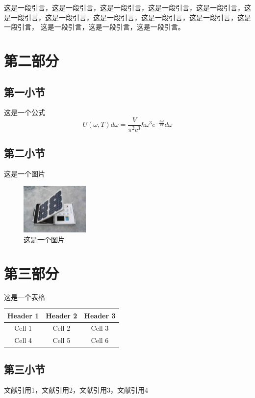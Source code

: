\documentclass[twocolumn]{ctexart}
\begin{document}
	这是一段引言，这是一段引言，这是一段引言，这是一段引言，这是一段引言，这是一段引言，这是一段引言，这是一段引言，这是一段引言，这是一段引言，这是一段引言，
	这是一段引言，这是一段引言，这是一段引言。
	\section{第二部分}
	\subsection{第一小节}
	这是一个公式
	 \begin{equation}
	 	U\left(\omega,T\right)d\omega =\frac{V}{{\pi}^2c^3}\hbar{\omega}^3e^{-\frac{\hbar\omega}{kT}}d\omega
	\end{equation}
	\subsection{第二小节}
	这是一个图片
	\begin{figure}[H]
		\centering
		\includegraphics[width=0.3\textwidth]{图片.jpg}
		\caption{这是一个图片}
		\label{fig:example}
	\end{figure}
	\section{第三部分}
	这是一个表格\par
	\begin{tabular}{|c|c|c|}
		\hline
		Header 1 & Header 2 & Header 3 \\
		\hline
		Cell 1 & Cell 2 & Cell 3 \\
		\hline
		Cell 4 & Cell 5 & Cell 6 \\
		\hline
	\end{tabular}
	\subsection{第三小节}
	文献引用1\cite{einstein_uber_1905}，文献引用2\cite{hertz_ueber_1887}，文献引用3\cite{rayleigh_liii_1900}，文献引用4\cite{wien_xxx_1897}

\end{document}
